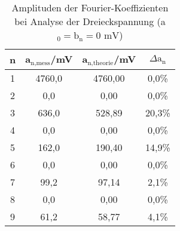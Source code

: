 \begin{table}[h]
	\begin{center}
		\begin{tabular}{cccc}
			n&a$_\text{n,mess}$/mV & a$_\text{n,theorie}$/mV & $\Delta \text{a}_\text{n}$\\ \hline
			1&4760,0&4760,00&0,0\%\\
			2&0,0&0,00&0,0\%\\
			3&636,0&528,89&20,3\%\\
			4&0,0&0,00&0,0\%\\
			5&162,0&190,40&14,9\%\\
			6&0,0&0,00&0,0\%\\
			7&99,2&97,14&2,1\%\\
			8&0,0&0,00&0,0\%\\
			9&61,2&58,77&4,1\%
		\end{tabular}
		\caption{Amplituden der Fourier-Koeffizienten bei Analyse der Dreieckspannung (a$_\text{0}=\text{b}_\text{n}=0\text{ mV}$)}
		\label{tabfad}
	\end{center}
\end{table}